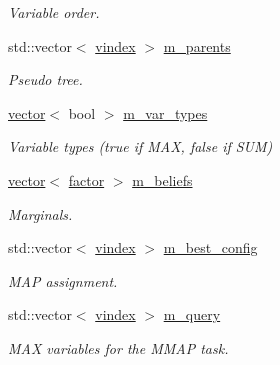 \begin{DoxyCompactItemize}
\begin{DoxyCompactList}\small\item\em Variable order. \end{DoxyCompactList}\item 
std\+::vector$<$ \hyperlink{classmerlin_1_1bte_afd42180c7906586fb39a0384d096fa4a}{vindex} $>$ \hyperlink{classmerlin_1_1bte_a1bd74ba2370fa0d0bf8be8525e705635}{m\+\_\+parents}\hypertarget{classmerlin_1_1bte_a1bd74ba2370fa0d0bf8be8525e705635}{}\label{classmerlin_1_1bte_a1bd74ba2370fa0d0bf8be8525e705635}

\begin{DoxyCompactList}\small\item\em Pseudo tree. \end{DoxyCompactList}\item 
\hyperlink{classmerlin_1_1vector}{vector}$<$ bool $>$ \hyperlink{classmerlin_1_1bte_a57d5d78a3e2a90ee564bc843c6a9d6cc}{m\+\_\+var\+\_\+types}\hypertarget{classmerlin_1_1bte_a57d5d78a3e2a90ee564bc843c6a9d6cc}{}\label{classmerlin_1_1bte_a57d5d78a3e2a90ee564bc843c6a9d6cc}

\begin{DoxyCompactList}\small\item\em Variable types (true if M\+AX, false if S\+UM) \end{DoxyCompactList}\item 
\hyperlink{classmerlin_1_1vector}{vector}$<$ \hyperlink{classmerlin_1_1factor}{factor} $>$ \hyperlink{classmerlin_1_1bte_adceba9204d07489b9e5439e717a6af31}{m\+\_\+beliefs}\hypertarget{classmerlin_1_1bte_adceba9204d07489b9e5439e717a6af31}{}\label{classmerlin_1_1bte_adceba9204d07489b9e5439e717a6af31}

\begin{DoxyCompactList}\small\item\em Marginals. \end{DoxyCompactList}\item 
std\+::vector$<$ \hyperlink{classmerlin_1_1bte_afd42180c7906586fb39a0384d096fa4a}{vindex} $>$ \hyperlink{classmerlin_1_1bte_ac8cfa8191cd5f4ddd059cc3211869b1b}{m\+\_\+best\+\_\+config}\hypertarget{classmerlin_1_1bte_ac8cfa8191cd5f4ddd059cc3211869b1b}{}\label{classmerlin_1_1bte_ac8cfa8191cd5f4ddd059cc3211869b1b}

\begin{DoxyCompactList}\small\item\em M\+AP assignment. \end{DoxyCompactList}\item 
std\+::vector$<$ \hyperlink{classmerlin_1_1bte_afd42180c7906586fb39a0384d096fa4a}{vindex} $>$ \hyperlink{classmerlin_1_1bte_a30dd2bcd11a71cbe1c3ce36da7fe8ffa}{m\+\_\+query}\hypertarget{classmerlin_1_1bte_a30dd2bcd11a71cbe1c3ce36da7fe8ffa}{}\label{classmerlin_1_1bte_a30dd2bcd11a71cbe1c3ce36da7fe8ffa}

\begin{DoxyCompactList}\small\item\em M\+AX variables for the M\+M\+AP task. \end{DoxyCompactList}\end{DoxyCompactItemize}
